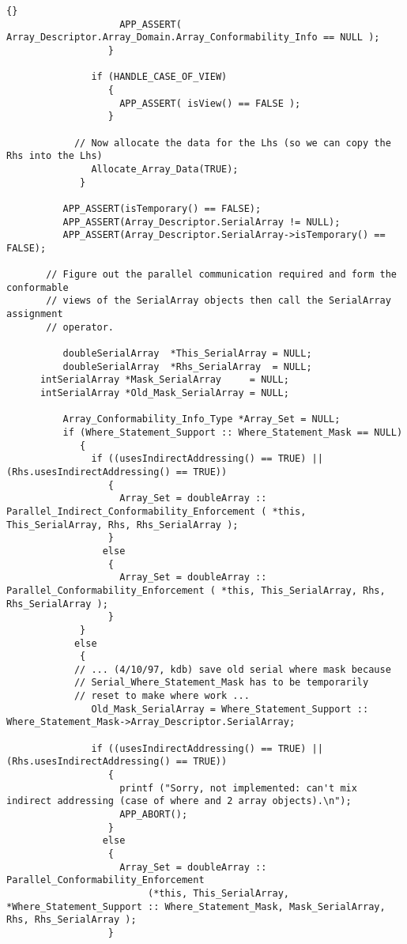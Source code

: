 \documentclass[10pt]{llncs}
\begin{document}
\begin{lstlisting}{}
                    APP_ASSERT( Array_Descriptor.Array_Domain.Array_Conformability_Info == NULL );
                  }

               if (HANDLE_CASE_OF_VIEW)
                  {
                    APP_ASSERT( isView() == FALSE );
                  }

            // Now allocate the data for the Lhs (so we can copy the Rhs into the Lhs)
               Allocate_Array_Data(TRUE);
             }

          APP_ASSERT(isTemporary() == FALSE);
          APP_ASSERT(Array_Descriptor.SerialArray != NULL);
          APP_ASSERT(Array_Descriptor.SerialArray->isTemporary() == FALSE);

       // Figure out the parallel communication required and form the conformable 
       // views of the SerialArray objects then call the SerialArray assignment 
       // operator.

          doubleSerialArray  *This_SerialArray = NULL;
          doubleSerialArray  *Rhs_SerialArray  = NULL;
	  intSerialArray *Mask_SerialArray     = NULL;
	  intSerialArray *Old_Mask_SerialArray = NULL;

          Array_Conformability_Info_Type *Array_Set = NULL;
          if (Where_Statement_Support :: Where_Statement_Mask == NULL)
             {
               if ((usesIndirectAddressing() == TRUE) || (Rhs.usesIndirectAddressing() == TRUE))
                  {
                    Array_Set = doubleArray :: Parallel_Indirect_Conformability_Enforcement ( *this, This_SerialArray, Rhs, Rhs_SerialArray );
                  }
                 else
                  {
                    Array_Set = doubleArray :: Parallel_Conformability_Enforcement ( *this, This_SerialArray, Rhs, Rhs_SerialArray );
                  }
             }
            else
             {
            // ... (4/10/97, kdb) save old serial where mask because
            // Serial_Where_Statement_Mask has to be temporarily 
            // reset to make where work ...
               Old_Mask_SerialArray = Where_Statement_Support :: Where_Statement_Mask->Array_Descriptor.SerialArray;

               if ((usesIndirectAddressing() == TRUE) || (Rhs.usesIndirectAddressing() == TRUE))
                  {
                    printf ("Sorry, not implemented: can't mix indirect addressing (case of where and 2 array objects).\n");
                    APP_ABORT();
                  }
                 else
                  {
                    Array_Set = doubleArray :: Parallel_Conformability_Enforcement
                         (*this, This_SerialArray, *Where_Statement_Support :: Where_Statement_Mask, Mask_SerialArray, Rhs, Rhs_SerialArray );
                  }


\end{lstlisting}
\end{document}
